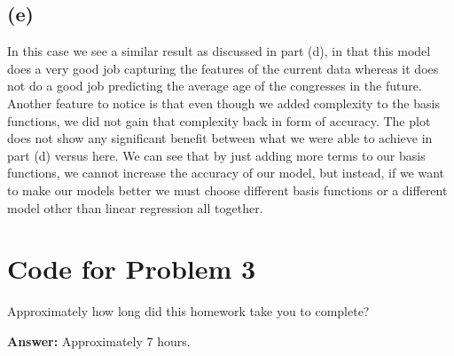 \documentclass[submit]{harvardml}
\begin{document}
\subsection*{(e)}
In this case we see a similar result as discussed in part (d), in that this model does a very good job capturing the features of the current data whereas it does not do a good job predicting the average age of the congresses in the future. Another feature to notice is that even though we added complexity to the basis functions, we did not gain that complexity back in form of accuracy. The plot does not show any significant benefit between what we were able to achieve in part (d) versus here. We can see that by just adding more terms to our basis functions, we cannot increase the accuracy of our model, but instead, if we want to make our models better we must choose different basis functions or a different model other than linear regression all together. 
\newpage
\section*{Code for Problem 3}


\newpage
\begin{problem}[Calibration, 1pt]
Approximately how long did this homework take you to complete?
\end{problem}
\textbf{Answer:}
Approximately 7 hours.
\end{document}
